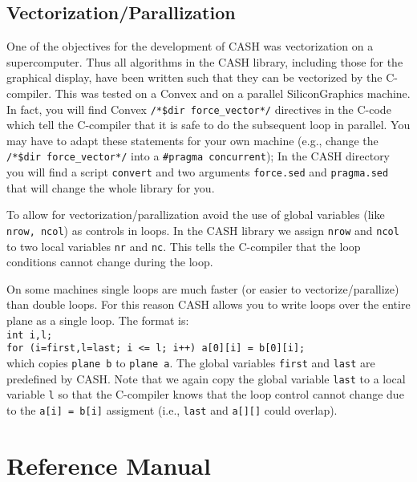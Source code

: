 \documentclass[12pt]{article}
\newcommand{\mtt}[1]{\texttt{\\#1\\}}
\begin{document}
\subsection{Vectorization/Parallization}
One of the   objectives for the development of CASH was
vectorization on a supercomputer. Thus all algorithms in the CASH
library, including those for the graphical display,  have been
written such that they can be vectorized by the C-compiler. This
was tested on a Convex and on a parallel SiliconGraphics machine. 
In fact, you will find Convex {\tt /*\$dir force\_vector*/}
directives in the C-code 
which tell the C-compiler that it is safe to do the subsequent
loop in parallel. 
You may have to adapt these statements for
your own machine (e.g., change the {\tt /*\$dir force\_vector*/}
into a {\tt \#pragma concurrent});
In the CASH directory you will find a script {\tt convert}
and two arguments {\tt force.sed} and {\tt pragma.sed} that will
change the whole library for you.

To allow for vectorization/parallization avoid the use of
global variables (like {\tt nrow, ncol}) as controls in loops.
In the CASH library  we
assign {\tt nrow} and {\tt ncol} to two local variables
{\tt nr} and {\tt nc}. This tells the C-compiler that 
the loop conditions cannot change during the loop.

On some machines single loops are much faster (or easier to
vectorize/parallize) than double loops. For this reason CASH
allows you to write loops over the entire plane as a single
loop. The format is:
\mtt{
int i,l;\\
for (i=first,l=last; i <= l; i++) a[0][i] = b[0][i];
}
which copies {\tt plane b} to {\tt plane a}. 
The global variables {\tt first} and {\tt last} are predefined
by CASH.
Note that we again copy the global variable {\tt last}
to a local variable {\tt l} so that the C-compiler knows that the
loop control cannot change due to the {\tt a[i] = b[i]}
assigment (i.e., {\tt last} and {\tt a[][]} could overlap).

\section{Reference Manual}
\end{document}
